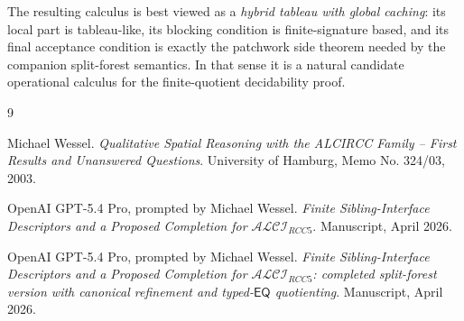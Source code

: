 \documentclass[11pt]{article}
\theoremstyle{remark}
\newcommand{\EQ}{\mathsf{EQ}}
\begin{document}
The resulting calculus is best viewed as a \emph{hybrid tableau with global caching}: its local part is tableau-like, its blocking condition is finite-signature based, and its final acceptance condition is exactly the patchwork side theorem needed by the companion split-forest semantics. In that sense it is a natural candidate operational calculus for the finite-quotient decidability proof.

\begin{thebibliography}{9}

Michael Wessel.
\newblock \emph{Qualitative Spatial Reasoning with the ALCIRCC Family -- First Results and Unanswered Questions}.
\newblock University of Hamburg, Memo No. 324/03, 2003.

OpenAI GPT-5.4 Pro, prompted by Michael Wessel.
\newblock \emph{Finite Sibling-Interface Descriptors and a Proposed Completion for $\mathcal{ALCI}_{RCC5}$}.
\newblock Manuscript, April 2026.

OpenAI GPT-5.4 Pro, prompted by Michael Wessel.
\newblock \emph{Finite Sibling-Interface Descriptors and a Proposed Completion for $\mathcal{ALCI}_{RCC5}$: completed split-forest version with canonical refinement and typed-$\EQ$ quotienting}.
\newblock Manuscript, April 2026.

\end{thebibliography}
\end{document}
